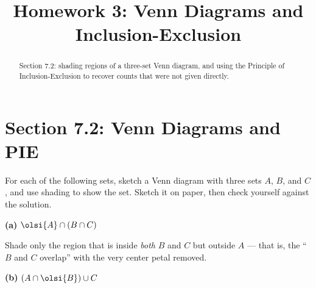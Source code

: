 \documentclass[12pt]{ximera}
\title{Homework 3: Venn Diagrams and Inclusion-Exclusion}
\begin{document}
\begin{abstract}
Section 7.2: shading regions of a three-set Venn diagram, and using the Principle of
Inclusion-Exclusion to recover counts that were not given directly.
\end{abstract}
\maketitle

\section*{Section 7.2: Venn Diagrams and PIE}

\begin{problem}
For each of the following sets, sketch a Venn diagram with three sets $A$, $B$, and
$C$, and use shading to show the set. Sketch it on paper, then check yourself
against the solution.

\begin{prompt}
\textbf{(a)} $\olsi{A}\cap\left(B\cap C\right)$

\begin{freeResponse}
\end{freeResponse}

\begin{feedback}
Shade only the region that is inside \emph{both} $B$ and $C$ but outside $A$ ---
that is, the ``$B$ and $C$ overlap'' with the very center petal removed.
\begin{center}
\end{center}
\end{feedback}
\end{prompt}

\begin{prompt}
\textbf{(b)} $\left(A\cap\olsi{B}\right)\cup C$

\begin{freeResponse}
\end{freeResponse}


\end{prompt}
\end{problem}
\end{document}
